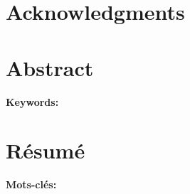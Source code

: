 \documentclass[english]{spimufcphdthesis}
\begin{document}
%	


\normalem %


 
\dominitoc



{
\clearpage
\thispagestyle{empty} 

\clearpage
}

\chapter*{Acknowledgments}


\chapter*{Abstract}
\mySummary{\par}

{\bfseries Keywords:} \phdthesismainkeywords

\chapter*{R{\'e}sum{\'e}}
\monResume{\par}

{\bfseries Mots-cl{\'e}s:} \mesMotsCles
                            
\setcounter{tocdepth}{2}
\tableofcontents

\end{document}
